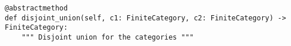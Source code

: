 \par\begin{minipage}{83ex}
\begin{verbatim}
@abstractmethod
def disjoint_union(self, c1: FiniteCategory, c2: FiniteCategory) -> FiniteCategory:
    """ Disjoint union for the categories """
\end{verbatim}
\end{minipage}\par